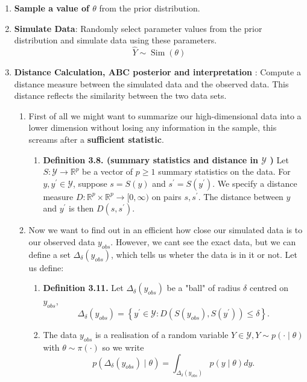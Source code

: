 \documentclass{article}
\begin{document}
\begin{enumerate}
    \item \textbf{Sample a value of $\theta
$ }from the prior distribution.
    \item \textbf{Simulate Data}: Randomly select parameter values from the prior distribution and simulate data using these parameters. $$
\hat{Y} \sim \operatorname{Sim}(\theta)
$$
    \item \textbf{Distance Calculation, ABC posterior and interpretation} : Compute a distance measure between the simulated data and the observed data. This distance reflects the similarity between the two data sets. 
    \begin{enumerate}
        \item First of all we might want to summarize our high-dimensional data into a lower dimension without losing any information in the sample, this screams after a \textbf{sufficient statistic}. 
        \begin{enumerate}
            \item \textbf{Definition 3.8. (summary statistics and distance in $\mathcal{Y}$ )} Let $S: \mathcal{Y} \rightarrow \mathbb{R}^p$ be a vector of $p \geq 1$ summary statistics on the data. For $y, y^{\prime} \in \mathcal{Y}$, suppose $s=S(y)$ and $s^{\prime}=S\left(y^{\prime}\right)$. We specify a distance measure $D: \mathbb{R}^p \times \mathbb{R}^p \rightarrow[0, \infty)$ on pairs $s, s^{\prime}$. The distance between $y$ and $y^{\prime}$ is then $D\left(s, s^{\prime}\right)$.
        \end{enumerate}
        \item Now we want to find out in an efficient how close our simulated data is to our observed data $y_{obs}$. However, we cant see the exact data, but we can define a set $\Delta_\delta\left(y_{o b s}\right)$, which tells us wheter the data is in it or not. Let us define: 
        \begin{enumerate}
            \item \textbf{Definition 3.11. }Let $\Delta_\delta\left(y_{o b s}\right)$ be a "ball" of radius $\delta$ centred on $y_{o b s}$,
$$
\Delta_\delta\left(y_{o b s}\right)=\left\{y^{\prime} \in \mathcal{Y}: D\left(S\left(y_{o b s}\right), S\left(y^{\prime}\right)\right) \leq \delta\right\} .
$$
\item The data $y_{o b s}$ is a realisation of a random variable $Y \in \mathcal{Y}, Y \sim p(\cdot \mid \theta)$ with $\theta \sim \pi(\cdot)$ so we write
$$
p\left(\Delta_\delta\left(y_{o b s}\right) \mid \theta\right)=\int_{\Delta_\delta\left(y_{o b s}\right)} p(y \mid \theta) d y .
$$
\end{enumerate}
\end{enumerate}
\end{enumerate}
\end{document}
